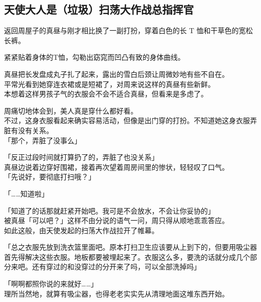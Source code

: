 \subsection{天使大人是（垃圾）扫荡大作战总指挥官}

返回周屋子的真昼与刚才相比换了一副打扮，穿着白色的长 T 恤和干草色的宽松长裤。

紧紧贴着身体的T恤，勾勒出窈窕而凹凸有致的身体曲线。

真昼把长发盘成丸子扎了起来，露出的雪白后颈让周微妙地有些不自在。\\

平常光看到她穿连衣裙或是短裙了，对周来说这样的真昼有些新鲜。\\

本想着这样男孩子气的衣服会不会不适合真昼，但看来是多虑了。

周痛切地体会到，美人真是穿什么都好看。\\

不过，这身衣服看起来确实容易活动，但像是出门穿的打扮。不知道她这身衣服弄脏有没有关系。\\

「那个，弄脏了没事么」

「反正过段时间就打算扔了的，弄脏了也没关系」\\

真昼边说着边穿好围裙，接着再次望着周房间里的惨状，轻轻叹了口气。\\

「先说好，要彻底打扫哦？」

「……知道啦」

「知道了的话那就赶紧开始吧。我可是不会放水，不会让你妥协的」\\

被真昼「可以吧？」这样不由分说的语气一问，周只得从顺地乖乖答应。\\

如此这般，由天使发起的扫荡大作战拉开了帷幕。\\

\vspace{2\baselineskip}

「总之衣服先放到洗衣篮里面吧。原本打扫卫生应该要从上到下的，但要用吸尘器首先得解决这些衣服。地板都要被埋起来了。衣服这么多，要洗的话就分成几个部分来吧。还有穿过的和没穿过的分开来了吗，可以全部洗掉吗」

「啊啊都照你说的来就好……」\\

理所当然地，就算有吸尘器，也得老老实实先从清理地面这堆东西开始。\\


